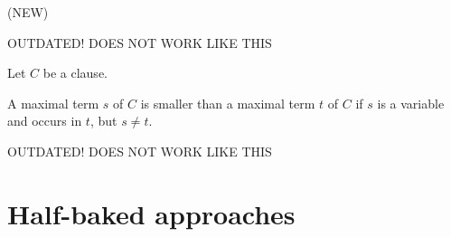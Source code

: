 \documentclass[,%
	paper=a4,%
	DIV20, 
	liststotoc,
	bibtotoc,
	draft=false,%
	numbers=noendperiod
]{scrartcl}
\begin{document}
\begin{defi}
	\label{def:order}
	(NEW)

	OUTDATED! DOES NOT WORK LIKE THIS

	Let $C$ be a clause.

	A maximal term $s$ of $C$ is smaller than a maximal term $t$ of $C$ if $s$ is a variable and occurs in $t$, but $s\neq t$. 

	OUTDATED! DOES NOT WORK LIKE THIS

\end{defi}

\section{Half-baked approaches}
\end{document}
